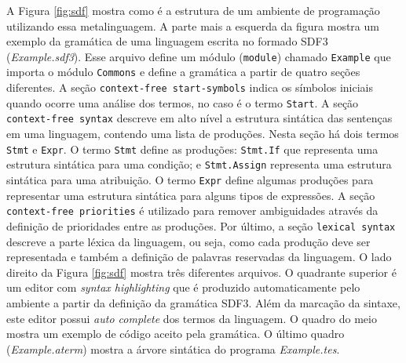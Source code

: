 A Figura \ref{fig:sdf} mostra como é a estrutura de um ambiente de programação utilizando essa metalinguagem. A parte mais a esquerda da figura mostra um exemplo da gramática de uma linguagem escrita no formado SDF3 (\textit{Example.sdf3}). Esse arquivo define um módulo (\texttt{module}) chamado \texttt{Example} que importa o módulo \texttt{Commons} e define a gramática a partir de quatro seções diferentes. 
A seção \texttt{context-free start-symbols} indica os símbolos iniciais quando ocorre uma análise dos termos, no caso é o termo \texttt{Start}. A seção \texttt{context-free syntax} descreve em alto nível a estrutura sintática das sentenças em uma linguagem, contendo uma lista de produções. Nesta seção há dois termos \texttt{Stmt} e \texttt{Expr}. O termo \texttt{Stmt} define as produções: \texttt{Stmt.If} que representa uma estrutura sintática para uma condição; e \texttt{Stmt.Assign} representa uma estrutura sintática para uma atribuição. O termo \texttt{Expr} define algumas produções para representar uma estrutura sintática para alguns tipos de expressões. A seção \texttt{context-free priorities} é utilizado para remover ambiguidades através da definição de prioridades entre as produções. Por último, a seção \texttt{lexical syntax} descreve a parte léxica da linguagem, ou seja, como cada produção deve ser representada e também a definição de palavras reservadas da linguagem. O lado direito da Figura \ref{fig:sdf} mostra três diferentes arquivos. O quadrante superior é um editor com \textit{syntax highlighting} que é produzido automaticamente pelo ambiente a partir da definição da gramática SDF3. Além da marcação da sintaxe, este editor possui \textit{auto complete} dos termos da linguagem.
O quadro do meio mostra um exemplo de código aceito pela gramática. O último quadro (\textit{Example.aterm}) mostra a árvore sintática do programa \textit{Example.tes}.



